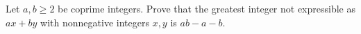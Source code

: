 Let $a,b\ge2$ be coprime integers. Prove that the greatest integer not expressible as $ax+by$ with nonnegative integers $x,y$ is $ab-a-b$.
